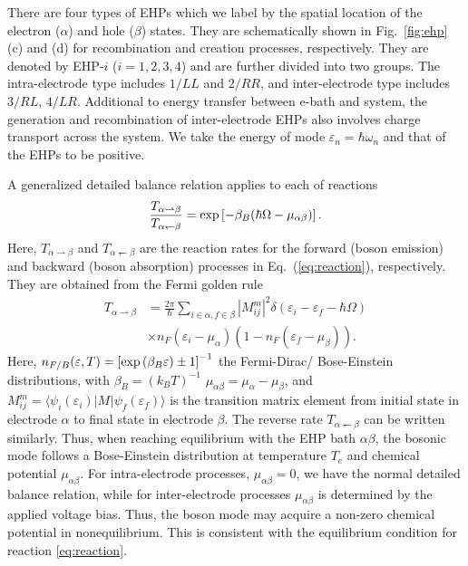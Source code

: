 \documentclass[aps
,twocolumn
,floatfix,footinbib,prl,longbibliography
]{revtex4-1}
\begin{document}
There are four types of EHPs which we label by the spatial location of the electron ($\alpha$) and hole  ($\beta$) states. They are schematically shown in Fig.~\ref{fig:ehp} (c) and (d) for recombination and creation processes, respectively. They are denoted by EHP-$i$ ($i=1,2,3,4$) and are further divided into two groups. The intra-electrode type includes $1/LL$ and $2/RR$, and inter-electrode type includes $3/RL$, $4/LR$.  Additional to energy transfer between e-bath and system, the generation and recombination of inter-electrode EHPs also involves charge transport across the system. We take the energy of mode  $\varepsilon_n=\hbar\omega_n$ and that of the EHPs to be positive. 


A generalized detailed balance relation applies to each of reactions
\begin{align}
\frac{T_{\alpha\rightharpoonup\beta}}{T_{\alpha\leftharpoondown\beta}} = {\rm exp}\left[-\beta_B(\hbar\Omega-\mu_{\alpha\beta})\right].
\end{align}
Here, $T_{\alpha\rightharpoonup\beta}$ and $T_{\alpha\leftharpoondown\beta}$ are the reaction rates for the forward (boson emission) and backward (boson absorption) processes in Eq.~(\ref{eq:reaction}), respectively. They are obtained from the Fermi golden rule
\begin{align}
T_{\alpha\rightharpoonup\beta} &= \frac{2\pi}{\hbar}\sum_{i\in\alpha,f\in\beta}|M^m_{ij}|^2  \delta(\varepsilon_i-\varepsilon_f-\hbar\Omega)  \nonumber\\
&\times n_F(\varepsilon_i-\mu_\alpha)(1-n_F(\varepsilon_f-\mu_\beta)).
\end{align}
Here, $n_{F/B}(\varepsilon,T) = \left[{\rm exp}\left(\beta_B \varepsilon\right)\pm 1\right]^{-1}$ the Fermi-Dirac/ Bose-Einstein distributions, with $\beta_B=(k_BT)^{-1}$ $\mu_{\alpha\beta}=\mu_\alpha-\mu_\beta$, and $M^m_{ij}=\langle \psi_{i}(\varepsilon_i)|M^{}|\psi_{f}(\varepsilon_f)\rangle$ is the transition matrix element from initial state in electrode $\alpha$ to final state in electrode $\beta$. The reverse rate $T_{\alpha\leftharpoondown\beta}$ can be written similarly.
Thus, when reaching equilibrium with the EHP bath $\alpha\beta$, the bosonic mode follows a Bose-Einstein distribution at temperature $T_e$ and chemical potential $\mu_{\alpha\beta}$. For intra-electrode processes, $\mu_{\alpha\beta}=0$, we have the normal detailed balance relation, while for inter-electrode processes $\mu_{\alpha\beta}$ is determined by the applied voltage bias. Thus, the boson mode may acquire a non-zero chemical potential in nonequilibrium. This is consistent with the equilibrium condition for reaction \ref{eq:reaction}.
\end{document}
